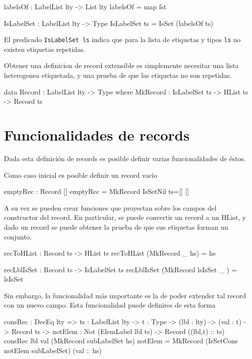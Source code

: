 \begin{code}
labelsOf : LabelList lty -> List lty
labelsOf = map fst

IsLabelSet : LabelList lty -> Type
IsLabelSet ts = IsSet (labelsOf ts)  
\end{code}

El predicado \texttt{IsLabelSet ls} indica que para la lista de etiquetas y tipos \texttt{ls} no existen etiquetas repetidas.

Obtener una definicion de record extensible es simplemente necesitar una lista heterogenea etiquetada, y una prueba de que las etiquetas no son repetidas.

\begin{code}
data Record : LabelList lty -> Type where
    MkRecord : IsLabelSet ts -> HList ts -> Record ts
\end{code}

\section{Funcionalidades de records}

Dada esta definición de records es posible definir varias funcionalidades de éstos.

Como caso inicial es posible definir un record vacío

\begin{code}
emptyRec : Record []
emptyRec = MkRecord IsSetNil {ts=[]} [] 
\end{code}

A su vez se pueden crear funciones que proyectan sobre los campos del constructor del record. En particular, se puede convertir un record a un HList, y dado un record se puede obtener la prueba de que sus etiquetas forman un conjunto.

\begin{code}
recToHList : Record ts -> HList ts
recToHList (MkRecord _ hs) = hs

recLblIsSet : Record ts -> IsLabelSet ts
recLblIsSet (MkRecord lsIsSet _ ) = lsIsSet  
\end{code}

Sin embargo, la funcionalidad más importante es la de poder extender tal record con un nuevo campo. Esta funcionalidad puede definirse de esta forma

\begin{code}
consRec : DecEq lty => {ts : LabelList lty} -> {t : Type} ->
    (lbl : lty) -> (val : t) ->  Record ts -> 
    {notElem : Not (ElemLabel lbl ts)} -> Record ((lbl,t) :: ts)
consRec lbl val (MkRecord subLabelSet hs) {notElem} = 
    MkRecord (IsSetCons notElem subLabelSet) (val :: hs)
\end{code}

